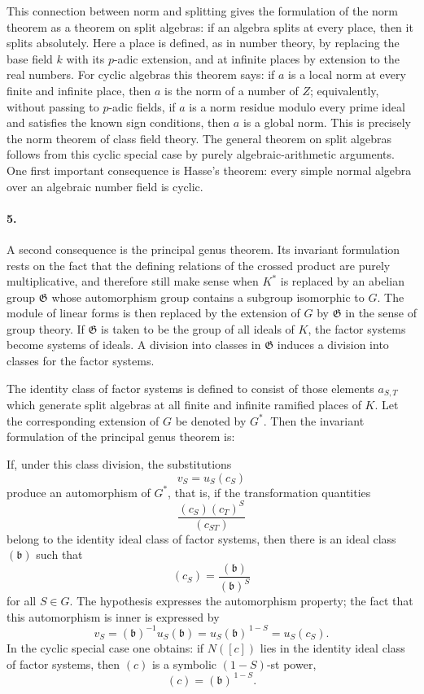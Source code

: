\documentclass[11pt]{article}
\begin{document}
This connection between norm and splitting gives the formulation of the norm theorem as a theorem on split algebras: if an algebra splits at every place, then it splits absolutely. Here a place is defined, as in number theory, by replacing the base field \(k\) with its \(p\)-adic extension, and at infinite places by extension to the real numbers. For cyclic algebras this theorem says: if \(a\) is a local norm at every finite and infinite place, then \(a\) is the norm of a number of \(Z\); equivalently, without passing to \(p\)-adic fields, if \(a\) is a norm residue modulo every prime ideal and satisfies the known sign conditions, then \(a\) is a global norm. This is precisely the norm theorem of class field theory. The general theorem on split algebras follows from this cyclic special case by purely algebraic-arithmetic arguments. One first important consequence is Hasse's theorem: every simple normal algebra over an algebraic number field is cyclic.

\paragraph{5.}
A second consequence is the principal genus theorem. Its invariant formulation rests on the fact that the defining relations of the crossed product are purely multiplicative, and therefore still make sense when \(K^*\) is replaced by an abelian group \(\mathfrak G\) whose automorphism group contains a subgroup isomorphic to \(G\). The module of linear forms is then replaced by the extension of \(G\) by \(\mathfrak G\) in the sense of group theory. If \(\mathfrak G\) is taken to be the group of all ideals of \(K\), the factor systems become systems of ideals. A division into classes in \(\mathfrak G\) induces a division into classes for the factor systems.

The identity class of factor systems is defined to consist of those elements \(a_{S,T}\) which generate split algebras at all finite and infinite ramified places of \(K\). Let the corresponding extension of \(G\) be denoted by \(G^*\). Then the invariant formulation of the principal genus theorem is:

If, under this class division, the substitutions
\[
        v_S=u_S(c_S)
\]
produce an automorphism of \(G^*\), that is, if the transformation quantities
\[
        \frac{(c_S)(c_T)^S}{(c_{ST})}
\]
belong to the identity ideal class of factor systems, then there is an ideal class \((\mathfrak b)\) such that
\[
        (c_S)=\frac{(\mathfrak b)}{(\mathfrak b)^S}
\]
for all \(S\in G\). The hypothesis expresses the automorphism property; the fact that this automorphism is inner is expressed by
\[
        v_S=(\mathfrak b)^{-1}u_S(\mathfrak b)
        =u_S(\mathfrak b)^{\,1-S}=u_S(c_S).
\]
In the cyclic special case one obtains: if \(N([c])\) lies in the identity ideal class of factor systems, then \((c)\) is a symbolic \((1-S)\)-st power,
\[
        (c)=(\mathfrak b)^{\,1-S}.
\]
\end{document}
